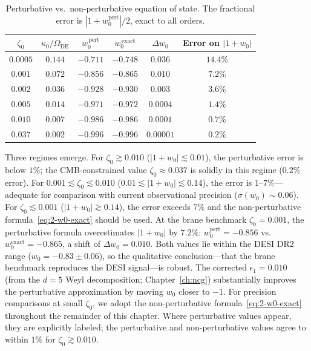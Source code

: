\begin{table}[htbp]
\centering
\caption{Perturbative vs.\ non-perturbative equation of state. The fractional error is $|1+w_0^{\mathrm{pert}}|/2$, exact to all orders.}
\label{tab:2-pertvalid}
\begin{tabular}{cccccc}
\toprule
$\zeta_0$ & $\kappa_0/\Omega_{\mathrm{DE}}$ & $w_0^{\,\mathrm{pert}}$ & $w_0^{\,\mathrm{exact}}$ & $\Delta w_0$ & Error on $|1{+}w_0|$ \\
\midrule
$0.0005$ & $0.144$ & $-0.711$ & $-0.748$ & $0.036$ & $14.4\%$ \\
$0.001$  & $0.072$ & $-0.856$ & $-0.865$ & $0.010$ & $7.2\%$ \\
$0.002$  & $0.036$ & $-0.928$ & $-0.930$ & $0.003$ & $3.6\%$ \\
$0.005$  & $0.014$ & $-0.971$ & $-0.972$ & $0.0004$ & $1.4\%$ \\
$0.010$  & $0.007$ & $-0.986$ & $-0.986$ & $0.0001$ & $0.7\%$ \\
$0.037$  & $0.002$ & $-0.996$ & $-0.996$ & $0.00001$ & $0.2\%$ \\
\bottomrule
\end{tabular}
\end{table}

Three regimes emerge. For $\zeta_0 \gtrsim 0.010$ ($|1{+}w_0| \lesssim 0.01$), the perturbative error is below $1\%$; the CMB-constrained value $\zeta_0 \approx 0.037$ is solidly in this regime ($0.2\%$ error). For $0.001 \lesssim \zeta_0 \lesssim 0.010$ ($0.01 \lesssim |1{+}w_0| \lesssim 0.14$), the error is $1$--$7\%$---adequate for comparison with current observational precision ($\sigma(w_0) \sim 0.06$). For $\zeta_0 \lesssim 0.001$ ($|1{+}w_0| \gtrsim 0.14$), the error exceeds $7\%$ and the non-perturbative formula~\eqref{eq:2-w0-exact} should be used. At the brane benchmark $\zeta_0 = 0.001$, the perturbative formula overestimates $|1{+}w_0|$ by $7.2\%$: $w_0^{\mathrm{pert}} = -0.856$ vs.\ $w_0^{\mathrm{exact}} = -0.865$, a shift of $\Delta w_0 = 0.010$. Both values lie within the DESI DR2 range ($w_0 = -0.83 \pm 0.06$), so the qualitative conclusion---that the brane benchmark reproduces the DESI signal---is robust. The corrected $\epsilon_1 = 0.010$ (from the $d = 5$ Weyl decomposition; Chapter~\ref{ch:ncg}) substantially improves the perturbative approximation by moving $w_0$ closer to $-1$. For precision comparisons at small $\zeta_0$, we adopt the non-perturbative formula~\eqref{eq:2-w0-exact} throughout the remainder of this chapter. Where perturbative values appear, they are explicitly labeled; the perturbative and non-perturbative values agree to within $1\%$ for $\zeta_0 \gtrsim 0.010$.


